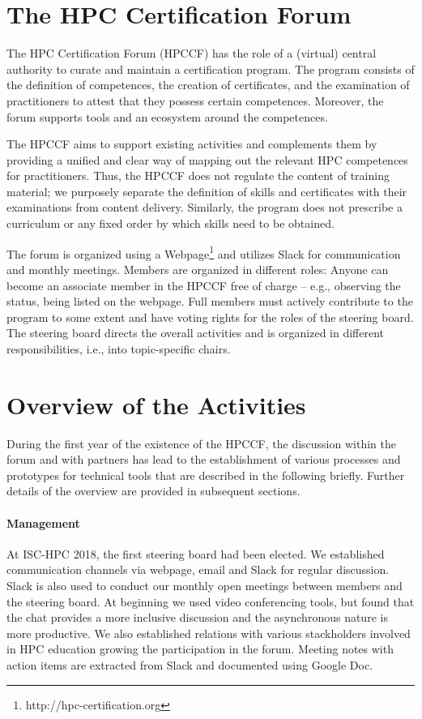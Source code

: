 \documentclass[jocse]{jocseart}
\begin{document}
\section{The HPC Certification Forum}
\label{sec:forum}

The HPC Certification Forum (HPCCF) has the role of a (virtual) central authority to curate and maintain a certification program.
The program consists of the definition of competences, the creation of certificates, and the examination of practitioners to attest that they possess certain competences.
Moreover, the forum supports tools and an ecosystem around the competences.

The HPCCF aims to support existing activities and complements them by providing a unified and clear way of mapping out the relevant HPC competences for practitioners.
Thus, the HPCCF does not regulate the content of training material; we purposely separate the definition of skills and certificates with their examinations from content delivery.
Similarly, the program does not prescribe a curriculum or any fixed order by which skills need to be obtained.

The forum is organized using a Webpage\footnote{http://hpc-certification.org} and utilizes Slack for communication and monthly meetings.
Members are organized in different roles:
Anyone can become an associate member in the HPCCF free of charge -- e.g., observing the status, being listed on the webpage.
Full members must actively contribute to the program to some extent and have voting rights for the roles of the steering board.
The steering board directs the overall activities and is organized in different responsibilities, i.e., into topic-specific chairs.


\section{Overview of the Activities}
\label{sec:status}

During the first year of the existence of the HPCCF, the discussion within the forum and with partners has lead to the establishment of various processes and prototypes for technical tools that are described in the following briefly.
Further details of the overview are provided in subsequent sections.

\paragraph{Management}
At ISC-HPC 2018, the first steering board had been elected.
We established communication channels via webpage, email and Slack for regular discussion.
Slack is also used to conduct our monthly open meetings between members and the steering board.
At beginning we used video conferencing tools, but found that the chat provides a more inclusive discussion and the asynchronous nature is more productive.
We also established relations with various stackholders involved in HPC education growing the participation in the forum.
Meeting notes with action items are extracted from Slack and documented using Google Doc.
\end{document}
